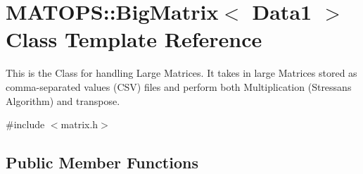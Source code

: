 \hypertarget{classMATOPS_1_1BigMatrix}{}\section{M\+A\+T\+O\+PS\+:\+:Big\+Matrix$<$ Data1 $>$ Class Template Reference}
\label{classMATOPS_1_1BigMatrix}


This is the Class for handling Large Matrices. It takes in large Matrices stored as comma-\/separated values (C\+SV) files and perform both Multiplication (Stressan\textquotesingle{}s Algorithm) and transpose.  




{\ttfamily \#include $<$matrix.\+h$>$}

\subsection*{Public Member Functions}
